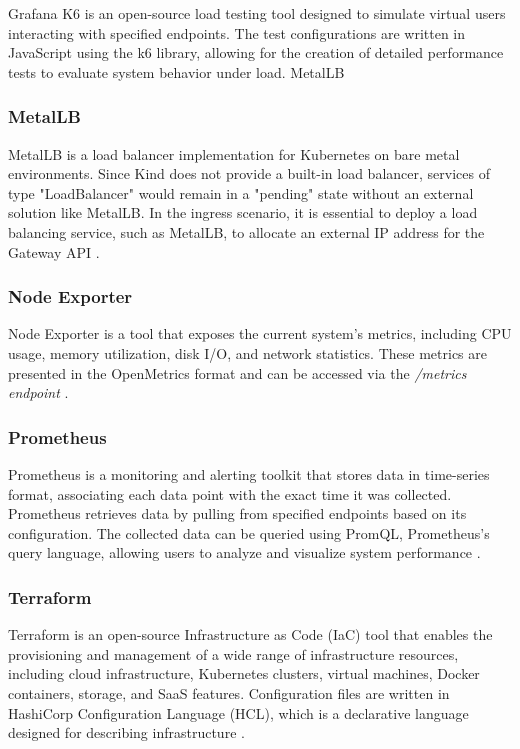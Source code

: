Grafana K6 is an open-source load testing tool designed to simulate virtual users interacting with specified endpoints. The test configurations are written in JavaScript using the k6 library, allowing for the creation of detailed performance tests to evaluate system behavior under load.
MetalLB

\subsubsection{MetalLB}
\label{sec:metallb}

MetalLB is a load balancer implementation for Kubernetes on bare metal environments. Since Kind does not provide a built-in load balancer, services of type "LoadBalancer" would remain in a "pending" state without an external solution like MetalLB. In the ingress scenario, it is essential to deploy a load balancing service, such as MetalLB, to allocate an external IP address for the Gateway API \cite{MetalLB}.

\subsubsection{Node Exporter}
\label{sec:nodeExporter}

Node Exporter is a tool that exposes the current system's metrics, including CPU usage, memory utilization, disk I/O, and network statistics. These metrics are presented in the OpenMetrics format and can be accessed via the \textit{/metrics endpoint} \cite{NodeExporter}.

\subsubsection{Prometheus}
\label{sec:prometheus}

Prometheus is a monitoring and alerting toolkit that stores data in time-series format, associating each data point with the exact time it was collected. Prometheus retrieves data by pulling from specified endpoints based on its configuration. The collected data can be queried using PromQL, Prometheus's query language, allowing users to analyze and visualize system performance \cite{Prometheus}.

\subsubsection{Terraform}
\label{sec:terraform}

Terraform is an open-source Infrastructure as Code (IaC) tool that enables the provisioning and management of a wide range of infrastructure resources, including cloud infrastructure, Kubernetes clusters, virtual machines, Docker containers, storage, and SaaS features. Configuration files are written in HashiCorp Configuration Language (HCL), which is a declarative language designed for describing infrastructure \cite{Terraform}.

